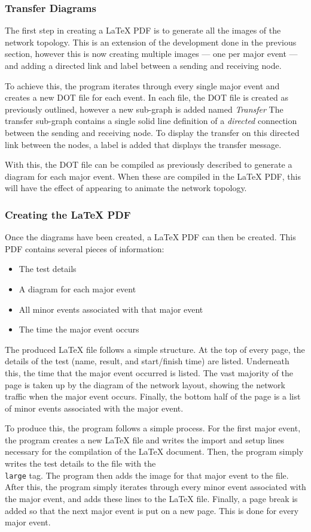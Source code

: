 \subsubsection{Transfer Diagrams}
The first step in creating a LaTeX PDF is to generate all the images of the network topology.
This is an extension of the development done in the previous section, however this is now creating multiple images — one per major event — and adding a directed link and label between a sending and receiving node.

To achieve this, the program iterates through every single major event and creates a new DOT file for each event.
In each file, the DOT file is created as previously outlined, however a new sub-graph is added named \emph{Transfer}
The transfer sub-graph contains a single solid line definition of a \emph{directed} connection between the sending and receiving node.
To display the transfer on this directed link between the nodes, a label is added that displays the transfer message.

With this, the DOT file can be compiled as previously described to generate a diagram for each major event.
When these are compiled in the LaTeX PDF, this will have the effect of appearing to animate the network topology.


\subsubsection{Creating the LaTeX PDF}
Once the diagrams have been created, a LaTeX PDF can then be created.
This PDF contains several pieces of information:
\begin{itemize}
    \item The test details
    \item A diagram for each major event
    \item All minor events associated with that major event
    \item The time the major event occurs
\end{itemize}
The produced LaTeX file follows a simple structure.
At the top of every page, the details of the test (name, result, and start/finish time) are listed.
Underneath this, the time that the major event occurred is listed. 
The vast majority of the page is taken up by the diagram of the network layout, showing the network traffic when the major event occurs.
Finally, the bottom half of the page is a list of minor events associated with the major event.

To produce this, the program follows a simple process.
For the first major event, the program creates a new LaTeX file and writes the import and setup lines necessary for the compilation of the LaTeX document.
Then, the program simply writes the test details to the file with the \texttt{\\large} tag.
The program then adds the image for that major event to the file. 
After this, the program simply iterates through every minor event associated with the major event, and adds these lines to the LaTeX file.
Finally, a page break is added so that the next major event is put on a new page.
This is done for every major event.

